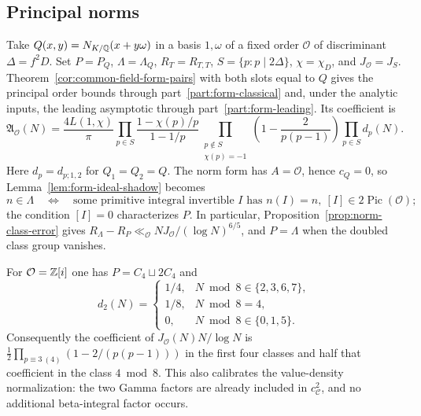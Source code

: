 \subsection{Principal norms}\label{sec:norms}
\label{thm:norm-order}\label{thm:norm-leading}

Take \(Q(x,y)=N_{K/\mathbb Q}(x+y\omega)\) in a basis \(1,\omega\) of
a fixed order \(\mathcal O\) of discriminant \(\Delta=f^2D\).
Set \(P=P_Q\), \(\Lambda=\Lambda_Q\), \(R_T=R_{T,T}\),
\(S=\{p:p\mid2\Delta\}\), \(\chi=\chi_D\), and \(J_{\mathcal O}=J_S\).
Theorem~\ref{cor:common-field-form-pairs} with both slots equal to
\(Q\) gives the principal order bounds through part~\ref{part:form-classical}
and, under the analytic inputs, the leading asymptotic through
part~\ref{part:form-leading}. Its coefficient is
\begin{equation}\label{eq:norm-coefficient}
 \mathfrak A_{\mathcal O}(N)=
 \frac{4L(1,\chi)}{\pi}
 \prod_{p\in S}\frac{1-\chi(p)/p}{1-1/p}
 \prod_{\substack{p\notin S\\\chi(p)=-1}}
                  \left(1-\frac2{p(p-1)}\right)
 \prod_{p\in S}d_p(N).
\end{equation}
Here \(d_p=d_{p;1,2}\) for \(Q_1=Q_2=Q\).
The norm form has \(A=\mathcal O\), hence \(c_Q=0\), so
Lemma~\ref{lem:form-ideal-shadow} becomes
\begin{equation}\label{eq:norm-shadow-ideals}
 n\in\Lambda\quad\Longleftrightarrow\quad
 \text{some primitive integral invertible }I
       \text{ has }n(I)=n,\ [I]\in2\operatorname{Pic}(\mathcal O);
\end{equation}
the condition \([I]=0\) characterizes \(P\). In particular,
Proposition~\ref{prop:norm-class-error} gives
\(R_\Lambda-R_P\ll_{\mathcal O}NJ_{\mathcal O}/(\log N)^{6/5}\),
and \(P=\Lambda\) when the doubled class group vanishes.

\begin{remark}
For $\mathcal O=\mathbb Z[i]$ one has $P=C_4\sqcup2C_4$ and
\[
 d_2(N)=
 \begin{cases}
 1/4,&N\bmod8\in\{2,3,6,7\},\\
 1/8,&N\bmod8=4,\\
 0,&N\bmod8\in\{0,1,5\}.
 \end{cases}
\]
Consequently the coefficient of $J_{\mathcal O}(N)N/\log N$ is
$\frac12\prod_{p\equiv3\ (4)}(1-2/(p(p-1)))$ in the first four
classes and half that coefficient in the class $4\bmod8$.
This also calibrates the value-density normalization: the two Gamma
factors are already included in $c_{\mathcal C}^2$, and no additional
beta-integral factor occurs.
\end{remark}
